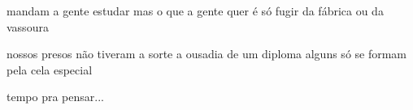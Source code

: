 \begin{poem}
\begin{stanza}
mandam a gente estudar\verseline
mas o que a gente quer é só\verseline
fugir da fábrica ou da vassoura
\end{stanza}
\begin{stanza}
nossos presos não tiveram
a sorte a ousadia de um diploma
\quad alguns só se formam pela cela especial
\end{stanza}
\begin{stanza}
tempo pra pensar...
\end{stanza}
\end{poem}